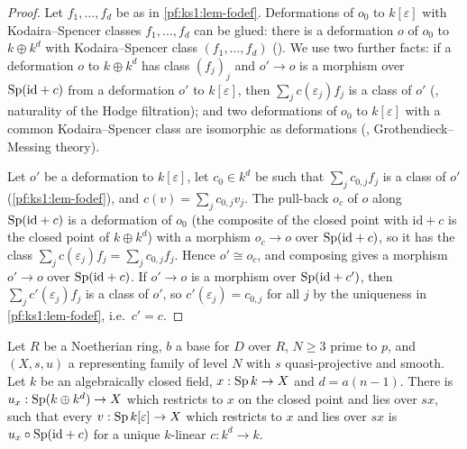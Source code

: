 \begin{proof}
Let $f_1,\dots,f_d$ be as in \cref{pf:ks1:lem-fodef}. Deformations of $o_0$ to $k[\varepsilon]$ with Kodaira--Spencer classes $f_1,\dots,f_d$ can be
glued: there is a deformation $o$ of $o_0$ to $k\oplus k^d$ with Kodaira--Spencer class $(f_1,\dots,f_d)$
(). We use two further facts: if a deformation $o$ to $k\oplus k^d$ has
class $(f_j)_j$ and $o'\to o$ is a morphism over $\operatorname{Sp}(\mathrm{id}+c)$ from a deformation $o'$ to $k[\varepsilon]$, then $\sum_jc(\varepsilon_j)f_j$
is a class of $o'$ (, naturality of the Hodge filtration); and two deformations of
$o_0$ to $k[\varepsilon]$ with a common Kodaira--Spencer class are isomorphic as deformations
(, Grothendieck--Messing theory).

Let $o'$ be a deformation to $k[\varepsilon]$, let $c_0\in k^d$ be such that $\sum_jc_{0,j}f_j$ is a class of $o'$ (\cref{pf:ks1:lem-fodef}), and
$c(v)=\sum_jc_{0,j}v_j$. The pull-back $o_c$ of $o$ along $\operatorname{Sp}(\mathrm{id}+c)$ is a deformation of $o_0$ (the composite of the closed point with
$\mathrm{id}+c$ is the closed point of $k\oplus k^d$) with a morphism $o_c\to o$ over $\operatorname{Sp}(\mathrm{id}+c)$, so it has the class
$\sum_jc(\varepsilon_j)f_j=\sum_jc_{0,j}f_j$. Hence $o'\cong o_c$, and composing gives a morphism $o'\to o$ over $\operatorname{Sp}(\mathrm{id}+c)$. If
$o'\to o$ is a morphism over $\operatorname{Sp}(\mathrm{id}+c')$, then $\sum_jc'(\varepsilon_j)f_j$ is a class of $o'$, so $c'(\varepsilon_j)=c_{0,j}$ for all $j$
by the uniqueness in \cref{pf:ks1:lem-fodef}, i.e.\ $c'=c$.
\end{proof}

\begin{proposition}\label{pf:ks1:prop-univtan}
Let $R$ be a Noetherian ring, $b$ a base for $D$ over $R$, $N\ge3$ prime to $p$, and $(X,s,u)$ a representing family of level $N$ with $s$
quasi-projective and smooth. Let $k$ be an algebraically closed field, $x:\operatorname{Sp} k\to X$ and $d=a(n-1)$. There is $u_x:\operatorname{Sp}(k\oplus k^d)\to X$
which restricts to $x$ on the closed point and lies over $sx$, such that every $v:\operatorname{Sp} k[\varepsilon]\to X$ which restricts to $x$ and lies over
$sx$ is $u_x\circ\operatorname{Sp}(\mathrm{id}+c)$ for a unique $k$-linear $c:k^d\to k$.
\end{proposition}

